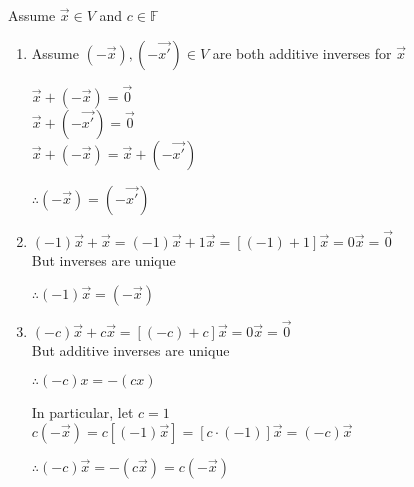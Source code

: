 \documentclass[letterpaper,12pt,fleqn]{article}
\newcommand{\vx}{\vec{x}}
\newcommand{\vxp}{\vec{x'}}
\newcommand{\vi}{\vec{0}}
\newcommand{\F}{\mathbb{F}}
\begin{document}
\begin{theproof}
  Assume $\vx\in V$ and $c\in\F$
  \begin{enumerate}
    \item Assume $(-\vx),(-\vxp)\in V$ are both additive inverses for $\vx$

      $\vx+(-\vx)=\vi$ \\
      $\vx+(-\vxp)=\vi$ \\
      $\vx+(-\vx)=\vx+(-\vxp)$

      $\therefore(-\vx)=(-\vxp)$

    \item

      $(-1)\vx+\vx=(-1)\vx+1\vx=[(-1)+1]\vx=0\vx=\vi$ \\
      But inverses are unique

      $\therefore (-1)\vx=(-\vx)$

    \item

      $(-c)\vx+c\vx=[(-c)+c]\vx=0\vx=\vi$ \\
      But additive inverses are unique

      $\therefore (-c)x=-(cx)$

      In particular, let $c=1$ \\
      $c(-\vx)=c[(-1)\vx]=[c\cdot(-1)]\vx=(-c)\vx$

      $\therefore (-c)\vx=-(c\vx)=c(-\vx)$
  \end{enumerate}
\end{theproof}
\end{document}
